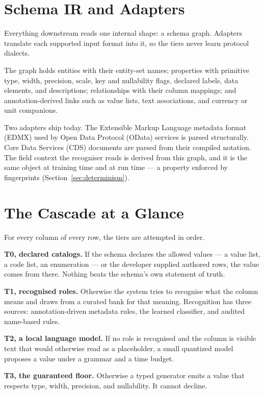 \documentclass[journal]{IEEEtran}
\begin{document}
\section{Schema IR and Adapters}
\label{sec:ir}

Everything downstream reads one internal shape: a schema graph. Adapters
translate each supported input format into it, so the tiers never learn
protocol dialects.

The graph holds entities with their entity-set names; properties with
primitive type, width, precision, scale, key and nullability flags,
declared labels, data elements, and descriptions; relationships with
their column mappings; and annotation-derived links such as value lists,
text associations, and currency or unit companions.

Two adapters ship today. The Extensible Markup Language metadata format
(EDMX) used by Open Data Protocol (OData) services is parsed
structurally. Core Data Services (CDS) documents are parsed from their
compiled notation. The field context the recogniser reads is derived
from this graph, and it is the same object at training time and at run
time --- a property enforced by fingerprints
(Section~\ref{sec:determinism}).

\section{The Cascade at a Glance}
\label{sec:cascade}

For every column of every row, the tiers are attempted in order.

\textbf{T0, declared catalogs.} If the schema declares the allowed
values --- a value list, a code list, an enumeration --- or the
developer supplied authored rows, the value comes from there. Nothing
beats the schema's own statement of truth.

\textbf{T1, recognised roles.} Otherwise the system tries to recognise
what the column means and draws from a curated bank for that meaning.
Recognition has three sources: annotation-driven metadata rules, the
learned classifier, and audited name-based rules.

\textbf{T2, a local language model.} If no role is recognised and the
column is visible text that would otherwise read as a placeholder, a
small quantized model proposes a value under a grammar and a time
budget.

\textbf{T3, the guaranteed floor.} Otherwise a typed generator emits a
value that respects type, width, precision, and nullability. It cannot
decline.
\end{document}
